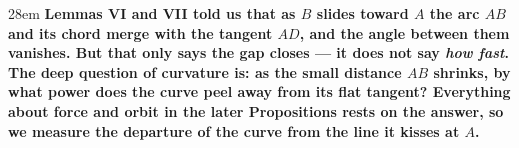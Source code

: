 \documentclass[border=4pt]{standalone}
\begin{document}
\begin{varwidth}{28em}
\large\bfseries
Lemmas VI and VII told us that as $B$ slides toward $A$ the \textcolor{arcgreen}{arc $AB$}      and its chord merge with \textcolor{tanblue}{the tangent $AD$}, and the angle between them      vanishes. But that only says the gap closes — it does not say \textit{how fast}.      The deep question of curvature is: as the small distance $AB$ shrinks, by what      power does the curve peel away from its \textcolor{tanblue}{flat tangent}? Everything about      force and orbit in the later Propositions rests on the answer, so we measure the      departure of the \textcolor{arcgreen}{curve} from the line it kisses at $A$.
\end{varwidth}
\end{document}
